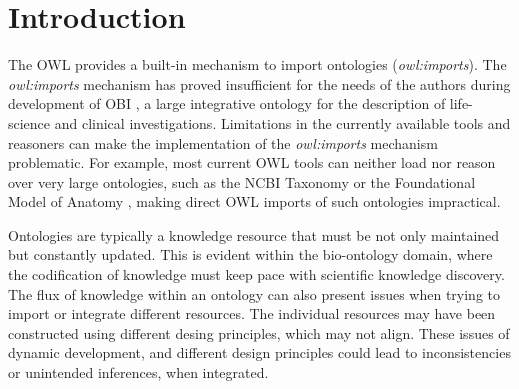 \documentclass[a4paper,10pt,twocolumn]{article}
\newcommand{\protege}{Prot\'{e}g\'{e}}
\begin{document}
\section*{Introduction}
\label{intro}
The \ac{OWL} \cite{RefWorks:1506} provides a built-in mechanism to import ontologies (\emph{owl:imports}).
The \emph{owl:imports} mechanism has proved insufficient for the needs of the authors during development of \ac{OBI} \cite{RefWorks:1507}, a large integrative ontology for the description of life-science and clinical investigations.
Limitations in the currently available tools and reasoners can make the implementation of the \emph{owl:imports} mechanism problematic.
For example, most current OWL tools can neither load nor reason over very large ontologies, such as the NCBI Taxonomy \cite{RefWorks:1502} or the Foundational Model of Anatomy \cite{RefWorks:1558}, making direct \ac{OWL} imports of such ontologies impractical.




Ontologies are typically a knowledge resource that must be not only maintained but constantly updated.
This is evident within the bio-ontology domain, where the codification of knowledge must keep pace with scientific knowledge discovery.
The flux of knowledge within an ontology can also present issues when trying to import or integrate different resources.
The individual resources may have been constructed using different desing principles, which may not align.
These issues of dynamic development, and different design principles could lead to inconsistencies or unintended inferences, when integrated.
\end{document}
